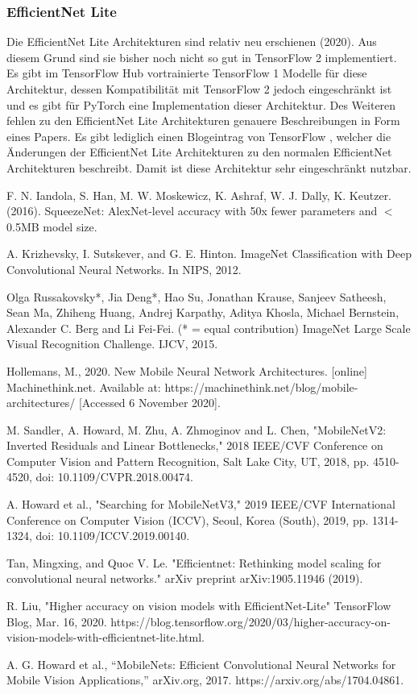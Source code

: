 \documentclass[conference]{IEEEtran}
\begin{document}
\subsubsection{EfficientNet Lite}
Die EfficientNet Lite Architekturen sind relativ neu erschienen (2020). Aus diesem Grund sind sie bisher noch nicht so gut in TensorFlow 2 implementiert. Es gibt im TensorFlow Hub vortrainierte TensorFlow 1 Modelle für diese Architektur, dessen Kompatibilität mit TensorFlow 2 jedoch eingeschränkt ist und es gibt für PyTorch eine Implementation dieser Architektur. Des Weiteren fehlen zu den EfficientNet Lite Architekturen genauere Beschreibungen in Form eines Papers. Es gibt lediglich einen Blogeintrag von TensorFlow \cite{b8}, welcher die Änderungen der EfficientNet Lite Architekturen zu den normalen EfficientNet Architekturen beschreibt. Damit ist diese Architektur sehr eingeschränkt nutzbar.


\begin{thebibliography}{00}
 F. N. Iandola, S. Han, M. W. Moskewicz, K. Ashraf, W. J. Dally, K. Keutzer. (2016). SqueezeNet: AlexNet-level accuracy with 50x fewer parameters and $<$0.5MB model size.

 A. Krizhevsky, I. Sutskever, and G. E. Hinton. ImageNet Classification with Deep Convolutional Neural Networks. In NIPS, 2012.

 Olga Russakovsky*, Jia Deng*, Hao Su, Jonathan Krause, Sanjeev Satheesh, Sean Ma, Zhiheng Huang, Andrej Karpathy, Aditya Khosla, Michael Bernstein, Alexander C. Berg and Li Fei-Fei. (* = equal contribution) ImageNet Large Scale Visual Recognition Challenge. IJCV, 2015.

 Hollemans, M., 2020. New Mobile Neural Network Architectures. [online] Machinethink.net. Available at: https://machinethink.net/blog/mobile-architectures/ [Accessed 6 November 2020].

 M. Sandler, A. Howard, M. Zhu, A. Zhmoginov and L. Chen, "MobileNetV2: Inverted Residuals and Linear Bottlenecks," 2018 IEEE/CVF Conference on Computer Vision and Pattern Recognition, Salt Lake City, UT, 2018, pp. 4510-4520, doi: 10.1109/CVPR.2018.00474.

 A. Howard et al., "Searching for MobileNetV3," 2019 IEEE/CVF International Conference on Computer Vision (ICCV), Seoul, Korea (South), 2019, pp. 1314-1324, doi: 10.1109/ICCV.2019.00140.

 Tan, Mingxing, and Quoc V. Le. "Efficientnet: Rethinking model scaling for convolutional neural networks." arXiv preprint arXiv:1905.11946 (2019).

 R. Liu, "Higher accuracy on vision models with EfficientNet-Lite" TensorFlow Blog, Mar. 16, 2020. https://blog.tensorflow.org/2020/03/higher-accuracy-on-vision-models-with-efficientnet-lite.html.

 A. G. Howard et al., “MobileNets: Efficient Convolutional Neural Networks for Mobile Vision Applications,” arXiv.org, 2017. https://arxiv.org/abs/1704.04861.
\end{thebibliography}
\end{document}
